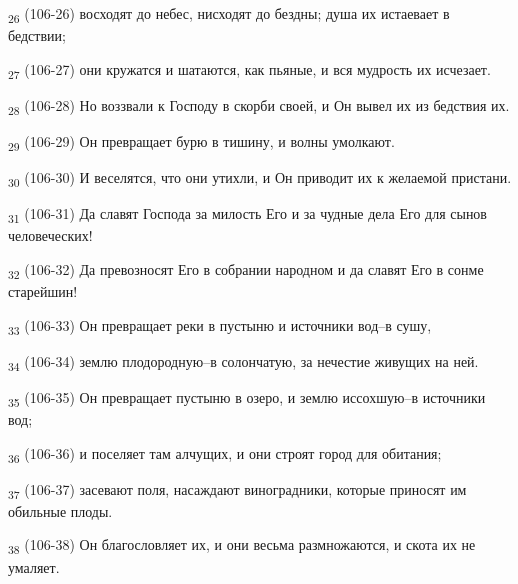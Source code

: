\begin{tcolorbox}
\textsubscript{26} (106-26) восходят до небес, нисходят до бездны; душа их истаевает в бедствии;
\end{tcolorbox}
\begin{tcolorbox}
\textsubscript{27} (106-27) они кружатся и шатаются, как пьяные, и вся мудрость их исчезает.
\end{tcolorbox}
\begin{tcolorbox}
\textsubscript{28} (106-28) Но воззвали к Господу в скорби своей, и Он вывел их из бедствия их.
\end{tcolorbox}
\begin{tcolorbox}
\textsubscript{29} (106-29) Он превращает бурю в тишину, и волны умолкают.
\end{tcolorbox}
\begin{tcolorbox}
\textsubscript{30} (106-30) И веселятся, что они утихли, и Он приводит их к желаемой пристани.
\end{tcolorbox}
\begin{tcolorbox}
\textsubscript{31} (106-31) Да славят Господа за милость Его и за чудные дела Его для сынов человеческих!
\end{tcolorbox}
\begin{tcolorbox}
\textsubscript{32} (106-32) Да превозносят Его в собрании народном и да славят Его в сонме старейшин!
\end{tcolorbox}
\begin{tcolorbox}
\textsubscript{33} (106-33) Он превращает реки в пустыню и источники вод--в сушу,
\end{tcolorbox}
\begin{tcolorbox}
\textsubscript{34} (106-34) землю плодородную--в солончатую, за нечестие живущих на ней.
\end{tcolorbox}
\begin{tcolorbox}
\textsubscript{35} (106-35) Он превращает пустыню в озеро, и землю иссохшую--в источники вод;
\end{tcolorbox}
\begin{tcolorbox}
\textsubscript{36} (106-36) и поселяет там алчущих, и они строят город для обитания;
\end{tcolorbox}
\begin{tcolorbox}
\textsubscript{37} (106-37) засевают поля, насаждают виноградники, которые приносят им обильные плоды.
\end{tcolorbox}
\begin{tcolorbox}
\textsubscript{38} (106-38) Он благословляет их, и они весьма размножаются, и скота их не умаляет.
\end{tcolorbox}
